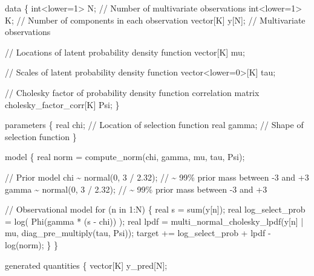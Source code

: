 \documentclass[
  letterpaper,
  DIV=11,
  numbers=noendperiod]{scrartcl}
\newenvironment{Shaded}{\begin{snugshade}}{\end{snugshade}}
\newcommand{\CommentTok}[1]{\textcolor[rgb]{0.37,0.37,0.37}{#1}}
\newcommand{\ControlFlowTok}[1]{\textcolor[rgb]{0.00,0.23,0.31}{#1}}
\newcommand{\DataTypeTok}[1]{\textcolor[rgb]{0.68,0.00,0.00}{#1}}
\newcommand{\DecValTok}[1]{\textcolor[rgb]{0.68,0.00,0.00}{#1}}
\newcommand{\FloatTok}[1]{\textcolor[rgb]{0.68,0.00,0.00}{#1}}
\newcommand{\KeywordTok}[1]{\textcolor[rgb]{0.00,0.23,0.31}{#1}}
\newcommand{\NormalTok}[1]{\textcolor[rgb]{0.00,0.23,0.31}{#1}}
\begin{document}
\begin{codelisting}
\begin{Shaded}
\begin{Highlighting}[]
\KeywordTok{data}\NormalTok{ \{}
  \DataTypeTok{int}\NormalTok{\textless{}}\KeywordTok{lower}\NormalTok{=}\DecValTok{1}\NormalTok{\textgreater{} N; }\CommentTok{// Number of multivariate observations}
  \DataTypeTok{int}\NormalTok{\textless{}}\KeywordTok{lower}\NormalTok{=}\DecValTok{1}\NormalTok{\textgreater{} K; }\CommentTok{// Number of components in each observation}
  \DataTypeTok{vector}\NormalTok{[K] y[N]; }\CommentTok{// Multivariate observations}
  
  \CommentTok{// Locations of latent probability density function}
  \DataTypeTok{vector}\NormalTok{[K] mu;}

  \CommentTok{// Scales of latent probability density function}
  \DataTypeTok{vector}\NormalTok{\textless{}}\KeywordTok{lower}\NormalTok{=}\DecValTok{0}\NormalTok{\textgreater{}[K] tau;}

  \CommentTok{// Cholesky factor of probability density function correlation matrix}
  \DataTypeTok{cholesky\_factor\_corr}\NormalTok{[K] Psi;}
\NormalTok{\}}

\KeywordTok{parameters}\NormalTok{ \{}
  \DataTypeTok{real}\NormalTok{ chi;   }\CommentTok{// Location of selection function}
  \DataTypeTok{real}\NormalTok{ gamma; }\CommentTok{// Shape of selection function}
\NormalTok{\}}

\KeywordTok{model}\NormalTok{ \{}
  \DataTypeTok{real}\NormalTok{ norm = compute\_norm(chi, gamma, mu, tau, Psi);}
  
  \CommentTok{// Prior model}
\NormalTok{  chi \textasciitilde{} normal(}\DecValTok{0}\NormalTok{, }\DecValTok{3}\NormalTok{ / }\FloatTok{2.32}\NormalTok{);   }\CommentTok{// \textasciitilde{} 99\% prior mass between {-}3 and +3}
\NormalTok{  gamma \textasciitilde{} normal(}\DecValTok{0}\NormalTok{, }\DecValTok{3}\NormalTok{ / }\FloatTok{2.32}\NormalTok{); }\CommentTok{// \textasciitilde{} 99\% prior mass between {-}3 and +3}
  
  \CommentTok{// Observational model}
  \ControlFlowTok{for}\NormalTok{ (n }\ControlFlowTok{in} \DecValTok{1}\NormalTok{:N) \{}
    \DataTypeTok{real}\NormalTok{ s = sum(y[n]);}
    \DataTypeTok{real}\NormalTok{ log\_select\_prob = log( Phi(gamma * (s {-} chi)) );}
    \DataTypeTok{real}\NormalTok{ lpdf = }
\NormalTok{      multi\_normal\_cholesky\_lpdf(y[n] | mu, diag\_pre\_multiply(tau, Psi));}
    \KeywordTok{target +=}\NormalTok{ log\_select\_prob + lpdf {-} log(norm);}
\NormalTok{  \}}
\NormalTok{\}}

\KeywordTok{generated quantities}\NormalTok{ \{}
  \DataTypeTok{vector}\NormalTok{[K] y\_pred[N];}
  

\end{Highlighting}
\end{Shaded}
\end{codelisting}
\end{document}
